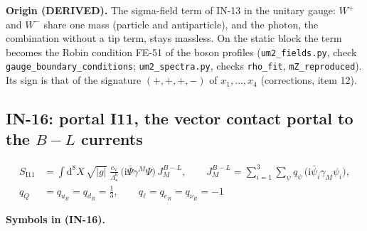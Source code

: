 \documentclass[
  10pt,
]{article}
\begin{document}
\textbf{Origin (DERIVED).} The sigma-field term of IN-13 in the unitary
gauge: \(W^+\) and \(W^-\) share one mass (particle and antiparticle),
and the photon, the combination without a tip term, stays massless. On
the static block the term becomes the Robin condition FE-51 of the boson
profiles (\texttt{um2\_fields.py}, check
\texttt{gauge\_boundary\_conditions}; \texttt{um2\_spectra.py}, checks
\texttt{rho\_fit}, \texttt{mZ\_reproduced}). Its sign is that of the
signature \((+,+,+,-)\) of \(x_1, \dots, x_4\) (corrections, item 12).

\hypertarget{in-16-portal-i11-the-vector-contact-portal-to-the-b---l-currents}{%
\subsection{\texorpdfstring{IN-16: portal I11, the vector contact portal
to the \(B - L\)
currents}{IN-16: portal I11, the vector contact portal to the B - L currents}}\label{in-16-portal-i11-the-vector-contact-portal-to-the-b---l-currents}}

\[
\begin{aligned}
S_{\mathrm{I11}} &= \int\mathrm{d}^8X\,\sqrt{\lvert g\rvert}\;\frac{c_{\mathrm{V}}}{\Lambda_\star^6}\,
 \big(\mathrm{i}\bar\Psi\gamma^M\Psi\big)\,J^{B-L}_M,\qquad
 J^{B-L}_M = \sum_{i=1}^{3}\sum_{\psi} q_\psi\,\big(\mathrm{i}\bar\psi_i\gamma_M\psi_i\big),\\
q_Q &= q_{u_R} = q_{d_R} = \frac13,\qquad q_\ell = q_{e_R} = q_{\nu_R} = -1
\end{aligned} \tag{IN-16}
\]

\textbf{Symbols in (IN-16).}
\end{document}
